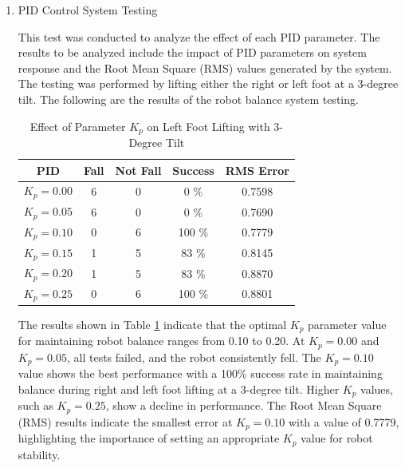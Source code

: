 \begin{enumerate}[label=\Alph*.]
    \item PID Control System Testing
    \label{subsec:results-discussion-pid}

    \hspace*{1em} This test was conducted to analyze the effect of each PID parameter. The results to be analyzed include the impact of PID parameters on system response and the Root Mean Square (RMS) values generated by the system. The testing was performed by lifting either the right or left foot at a 3-degree tilt. The following are the results of the robot balance system testing.

    \begin{table}[h]
        \centering
        \caption{Effect of Parameter $K_p$ on Left Foot Lifting with 3-Degree Tilt}
        \begin{tabular}{|c|c|c|c|c|}
            \hline
            \textbf{PID} & \textbf{Fall} & \textbf{Not Fall} & \textbf{Success} & RMS Error \\
            \hline
            $K_p = 0.00$ & 6 & 0 & 0   \% & 0.7598 \\
            $K_p = 0.05$ & 6 & 0 & 0   \% & 0.7690 \\
            $K_p = 0.10$ & 0 & 6 & 100 \% & 0.7779 \\
            $K_p = 0.15$ & 1 & 5 & 83  \% & 0.8145 \\
            $K_p = 0.20$ & 1 & 5 & 83  \% & 0.8870 \\
            $K_p = 0.25$ & 0 & 6 & 100 \% & 0.8801 \\            
            \hline
        \end{tabular}
        \label{tab:testing_p}
    \end{table}

    \hspace*{1em} The results shown in Table \ref{tab:testing_p} indicate that the optimal $K_p$ parameter value for maintaining robot balance ranges from 0.10 to 0.20. At $K_p = 0.00$ and $K_p = 0.05$, all tests failed, and the robot consistently fell. The $K_p = 0.10$ value shows the best performance with a 100\% success rate in maintaining balance during right and left foot lifting at a 3-degree tilt. Higher $K_p$ values, such as $K_p = 0.25$, show a decline in performance. The Root Mean Square (RMS) results indicate the smallest error at $K_p = 0.10$ with a value of 0.7779, highlighting the importance of setting an appropriate $K_p$ value for robot stability.


\end{enumerate}
